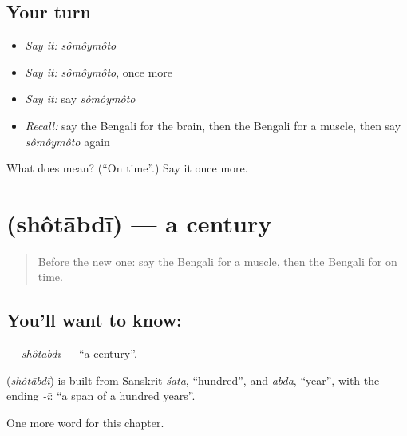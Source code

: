 \subsection*{Your turn}
\begin{itemize}
\raggedright
  \item \emph{Say it:} \emph{sômôymôto}
  \item \emph{Say it:} \emph{sômôymôto}, once more
  \item \emph{Say it:} say \emph{sômôymôto}
  \item \emph{Recall:} say the Bengali for the brain, then the Bengali for a muscle, then say \emph{sômôymôto} again
\end{itemize}

\begin{tcolorbox}[breakable,colback=teal!4,colframe=teal!35!black,title={Before you move on}]
What does  mean? (\textquotedblleft{}On time\textquotedblright{}.) Say it once more.
\end{tcolorbox}
\section[\texorpdfstring{\bn{শতাব্দী} (shôtābdī)}{শতাব্দী (shôtābdī)}]{ (shôtābdī) — a century}

\label{lesson:BN-C187-shotabdi}



\begin{quote}
Before the new one: say the Bengali for a muscle, then the Bengali for on time.
\end{quote}

\subsection*{You'll want to know: }
\textbf{} — \emph{shôtābdī} — \textquotedblleft{}a century\textquotedblright{}.

\begin{cousinweb}
\textbf{} (\emph{shôtābdī}) is built from Sanskrit \emph{śata}, \textquotedblleft{}hundred\textquotedblright{}, and \emph{abda}, \textquotedblleft{}year\textquotedblright{}, with the ending \emph{-ī}: \textquotedblleft{}a span of a hundred years\textquotedblright{}.
\end{cousinweb}

\begin{grammarlens}[title={What you've built}]
One more word for this chapter.
\end{grammarlens}

